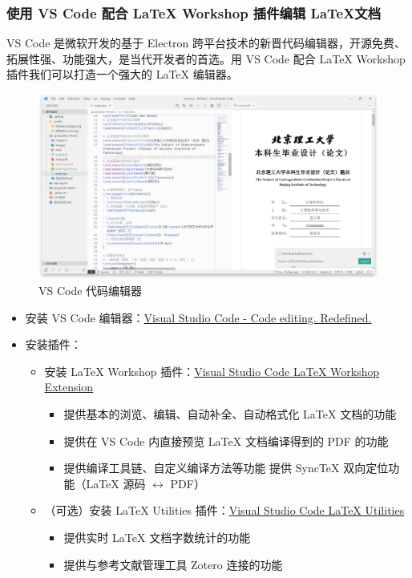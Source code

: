 \subsubsection{使用 VS Code 配合 {\LaTeX} Workshop 插件编辑 \LaTeX 文档}
VS Code 是微软开发的基于 Electron 跨平台技术的新晋代码编辑器，开源免费、拓展性强、功能强大，是当代开发者的首选。用 VS Code 配合 {\LaTeX} Workshop 插件我们可以打造一个强大的 {\LaTeX} 编辑器。

\begin{figure}[H]
  \centering
  \includegraphics[width=\textwidth]{images/vscode.png}
  \caption{VS Code 代码编辑器}
\end{figure}

\begin{itemize}
  \item 安装 VS Code 编辑器：\href{https://code.visualstudio.com/}{Visual Studio Code - Code editing. Redefined.}
  \item 安装插件：
        \begin{itemize}
          \item 安装 {\LaTeX} Workshop 插件：\href{https://marketplace.visualstudio.com/items?itemName=James-Yu.latex-workshop}{Visual Studio Code LaTeX Workshop Extension}
                \begin{itemize}
                  \item 提供基本的浏览、编辑、自动补全、自动格式化 {\LaTeX} 文档的功能
                  \item 提供在 VS Code 内直接预览 {\LaTeX} 文档编译得到的 PDF 的功能
                  \item 提供编译工具链、自定义编译方法等功能
                        提供 SyncTeX 双向定位功能（{\LaTeX} 源码 $\longleftrightarrow$ PDF）

                \end{itemize}
          \item （可选）安装 {\LaTeX} Utilities 插件：\href{https://marketplace.visualstudio.com/items?itemName=tecosaur.latex-utilities}{Visual Studio Code LaTeX Utilities}
                \begin{itemize}
                  \item 提供实时 {\LaTeX} 文档字数统计的功能
                  \item 提供与参考文献管理工具 Zotero 连接的功能
                \end{itemize}
        \end{itemize}
\end{itemize}

